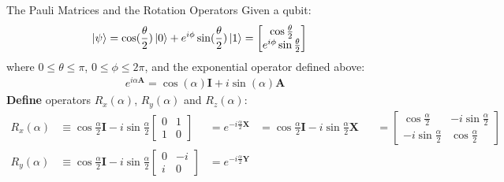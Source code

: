 \documentclass{beamer}
\begin{document}
\begin{frame}{The Pauli Matrices and the Rotation Operators\tiny\cite{rotationsonblochsphere}}
  {\tiny
    Given a qubit:
    \begin{align*}
      \ket{\psi} = \cos(\frac{\theta}2)\ket{0}+e^{i\phi}\sin(\frac{\theta}2)\ket{1} &= \begin{bmatrix}\cos{\frac{\theta}2} \\ e^{i\phi}\sin{\frac{\theta}2} \end{bmatrix}
    \end{align*}
    where $0\leqslant\theta\leqslant\pi$, $0\leqslant\phi\leqslant2\pi$, and the exponential operator defined above:
    \begin{align*}
      e^{i\alpha\mathbf{A}} = \cos(\alpha)\mathbf{I} + i\sin(\alpha)\mathbf{A}
    \end{align*}
    \textbf{Define} operators $R_x(\alpha)$, $R_y(\alpha)$ and $R_z(\alpha)$:
    \begin{align*}
      R_x(\alpha) &\equiv \cos\frac{\alpha}2\mathbf{I} - i\sin\frac{\alpha}2
                                                                     \begin{bmatrix}
                                                                       0 & 1 \\
                                                                       1 & 0
                                                                     \end{bmatrix}
                  &= e^{-i\frac{\alpha}2\mathbf{X}}
                  &= \cos\frac{\alpha}2\mathbf{I} - i\sin\frac{\alpha}2 \mathbf{X}
                  &&=\begin{bmatrix}
                    \cos\frac{\alpha}2 & -i\sin\frac{\alpha}2 \\
                    -i\sin\frac{\alpha}2 & \cos\frac{\alpha}2
                    \end{bmatrix} \\
      R_y(\alpha) &\equiv \cos\frac{\alpha}2\mathbf{I} - i\sin\frac{\alpha}2
                                                                     \begin{bmatrix}
                                                                       0 & -i \\
                                                                       i & 0
                                                                     \end{bmatrix}
                  &= e^{-i\frac{\alpha}2\mathbf{Y}}

\end{align*}}
\end{frame}
\end{document}
